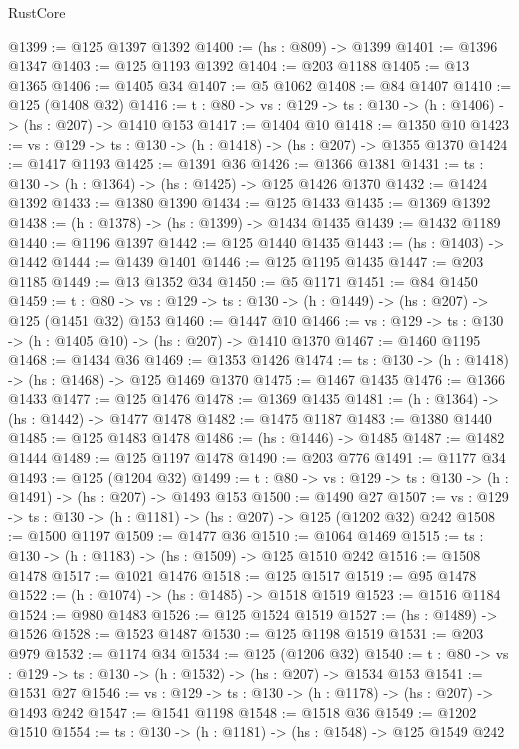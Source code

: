 \begin{lexlean}{RustCore}
\begin{coremodule}
@1399 := @125 @1397 @1392
@1400 := (hs : @809) -> @1399
@1401 := @1396 @1347
@1403 := @125 @1193 @1392
@1404 := @203 @1188
@1405 := @13 @1365
@1406 := @1405 @34
@1407 := @5 @1062
@1408 := @84 @1407
@1410 := @125 (@1408 @32)
@1416 := {t : @80} -> {vs : @129} -> {ts : @130} -> (h : @1406) -> (hs : @207) -> @1410 @153
@1417 := @1404 @10
@1418 := @1350 @10
@1423 := {vs : @129} -> {ts : @130} -> (h : @1418) -> (hs : @207) -> @1355 @1370
@1424 := @1417 @1193
@1425 := @1391 @36
@1426 := @1366 @1381
@1431 := {ts : @130} -> (h : @1364) -> (hs : @1425) -> @125 @1426 @1370
@1432 := @1424 @1392
@1433 := @1380 @1390
@1434 := @125 @1433
@1435 := @1369 @1392
@1438 := (h : @1378) -> (hs : @1399) -> @1434 @1435
@1439 := @1432 @1189
@1440 := @1196 @1397
@1442 := @125 @1440 @1435
@1443 := (hs : @1403) -> @1442
@1444 := @1439 @1401
@1446 := @125 @1195 @1435
@1447 := @203 @1185
@1449 := @13 @1352 @34
@1450 := @5 @1171
@1451 := @84 @1450
@1459 := {t : @80} ->
  {vs : @129} -> {ts : @130} -> (h : @1449) -> (hs : @207) -> @125 (@1451 @32) @153
@1460 := @1447 @10
@1466 := {vs : @129} -> {ts : @130} -> (h : @1405 @10) -> (hs : @207) -> @1410 @1370
@1467 := @1460 @1195
@1468 := @1434 @36
@1469 := @1353 @1426
@1474 := {ts : @130} -> (h : @1418) -> (hs : @1468) -> @125 @1469 @1370
@1475 := @1467 @1435
@1476 := @1366 @1433
@1477 := @125 @1476
@1478 := @1369 @1435
@1481 := (h : @1364) -> (hs : @1442) -> @1477 @1478
@1482 := @1475 @1187
@1483 := @1380 @1440
@1485 := @125 @1483 @1478
@1486 := (hs : @1446) -> @1485
@1487 := @1482 @1444
@1489 := @125 @1197 @1478
@1490 := @203 @776
@1491 := @1177 @34
@1493 := @125 (@1204 @32)
@1499 := {t : @80} -> {vs : @129} -> {ts : @130} -> (h : @1491) -> (hs : @207) -> @1493 @153
@1500 := @1490 @27
@1507 := {vs : @129} -> {ts : @130} -> (h : @1181) -> (hs : @207) -> @125 (@1202 @32) @242
@1508 := @1500 @1197
@1509 := @1477 @36
@1510 := @1064 @1469
@1515 := {ts : @130} -> (h : @1183) -> (hs : @1509) -> @125 @1510 @242
@1516 := @1508 @1478
@1517 := @1021 @1476
@1518 := @125 @1517
@1519 := @95 @1478
@1522 := (h : @1074) -> (hs : @1485) -> @1518 @1519
@1523 := @1516 @1184
@1524 := @980 @1483
@1526 := @125 @1524 @1519
@1527 := (hs : @1489) -> @1526
@1528 := @1523 @1487
@1530 := @125 @1198 @1519
@1531 := @203 @979
@1532 := @1174 @34
@1534 := @125 (@1206 @32)
@1540 := {t : @80} -> {vs : @129} -> {ts : @130} -> (h : @1532) -> (hs : @207) -> @1534 @153
@1541 := @1531 @27
@1546 := {vs : @129} -> {ts : @130} -> (h : @1178) -> (hs : @207) -> @1493 @242
@1547 := @1541 @1198
@1548 := @1518 @36
@1549 := @1202 @1510
@1554 := {ts : @130} -> (h : @1181) -> (hs : @1548) -> @125 @1549 @242

\end{coremodule}
\end{lexlean}
